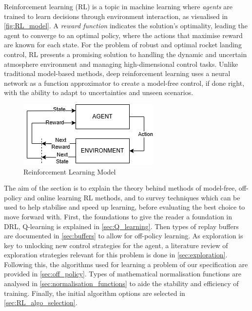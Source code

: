 Reinforcement learning (RL) is a topic in machine learning where \textit{agents} are trained to learn decisions through environment interaction, as visualised in \autoref{fig:RL_model}. A \textit{reward function} indicates the solution's optimality, leading the agent to converge to an optimal policy, where the actions that maximise reward are known for each state. For the problem of robust and optimal rocket landing control, RL presents a promising solution to handling the dynamic and uncertain atmosphere environment and managing high-dimensional control tasks. Unlike traditional model-based methods, deep reinforcement learning uses a neural network as a function approximator to create a model-free control, if done right, with the ability to adapt to uncertainties and unseen scenarios.

\begin{figure}[H]
    \centering
    \includegraphics[width=0.65\linewidth]{figures/LiteratureStudy/RL_diagram_basic.png}
    \caption{Reinforcement Learning Model}
    \label{fig:RL_model}
\end{figure}

The aim of the section is to explain the theory behind methods of model-free, off-policy and online learning RL methods, and to survey techniques which can be used to help stabilise and speed up learning, before evaluating the best choice to move forward with. First, the foundations to give the reader a foundation in DRL, Q-learning is explained in \autoref{sec:Q_learning}. Then types of replay buffers are documented in \autoref{sec:buffers} to allow for off-policy learning. As exploration is key to unlocking new control strategies for the agent, a literature review of exploration strategies relevant for this problem is done in \autoref{sec:exploration}. Following this, the algorithms used for learning a problem of our specification are provided in \autoref{sec:off_policy}. Types of mathematical normalisation functions are analysed in \autoref{sec:normalisation_functions} to aide the stability and efficiency of training. Finally, the initial algorithm options are selected in \autoref{sec:RL_algo_selection}.

